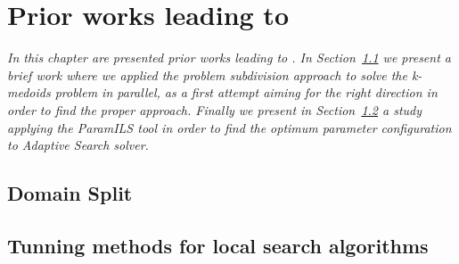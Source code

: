 \chapter{Prior works leading to \posl}
\label{chap:prior}
\textit{In this chapter are presented prior works leading to \posl. In Section~\ref{sec:split} we present a brief work where we applied the {\it problem subdivision} approach to solve the {\it k-medoids problem} in parallel, as a first attempt aiming for the right direction in order to find the proper approach. Finally we present in Section~\ref{sec:paramils} a study applying the {\sc ParamILS} tool in order to find the optimum parameter configuration to {\it Adaptive Search} solver.}

\vspace{2ex}\vfill
\minitoc
\newpage



%

\section{Domain Split}
\label{sec:split}




\section{Tunning methods for local search algorithms}
\label{sec:paramils}

